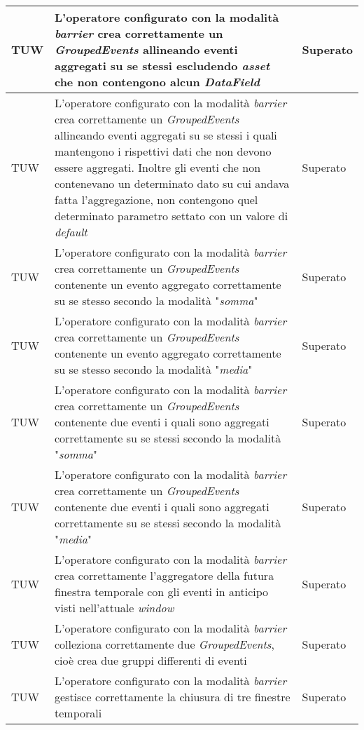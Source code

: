 {\begin{longtable}{L{3cm} L{8.5cm} L{2cm}}
TUW & L'operatore configurato con la modalità \textit{barrier} crea correttamente un \textit{GroupedEvents} allineando eventi aggregati su se stessi escludendo \textit{asset} che non contengono alcun \textit{DataField} & Superato \\
\hline
TUW & L'operatore configurato con la modalità \textit{barrier} crea correttamente un \textit{GroupedEvents} allineando eventi aggregati su se stessi i quali mantengono i rispettivi dati che non devono essere aggregati. Inoltre gli eventi che non contenevano un determinato dato su cui andava fatta l'aggregazione, non contengono quel determinato parametro settato con un valore di \textit{default} & Superato \\
\hline
TUW & L'operatore configurato con la modalità \textit{barrier} crea correttamente un \textit{GroupedEvents} contenente un evento aggregato correttamente su se stesso secondo la modalità "\textit{somma}" & Superato \\
\hline
TUW & L'operatore configurato con la modalità \textit{barrier} crea correttamente un \textit{GroupedEvents} contenente un evento aggregato correttamente su se stesso secondo la modalità "\textit{media}" & Superato \\
\hline
TUW & L'operatore configurato con la modalità \textit{barrier} crea correttamente un \textit{GroupedEvents} contenente due eventi i quali sono aggregati correttamente su se stessi secondo la modalità "\textit{somma}" & Superato \\
\hline
TUW & L'operatore configurato con la modalità \textit{barrier} crea correttamente un \textit{GroupedEvents} contenente due eventi i quali sono aggregati correttamente su se stessi secondo la modalità "\textit{media}" & Superato \\
\hline
TUW & L'operatore configurato con la modalità \textit{barrier} crea correttamente l'aggregatore della futura finestra temporale con gli eventi in anticipo visti nell'attuale \textit{window} & Superato \\
\hline
TUW & L'operatore configurato con la modalità \textit{barrier} colleziona correttamente due \textit{GroupedEvents}, cioè crea due gruppi differenti di eventi & Superato \\
\hline
TUW & L'operatore configurato con la modalità \textit{barrier} gestisce correttamente la chiusura di tre finestre temporali & Superato \\

\end{longtable}}
